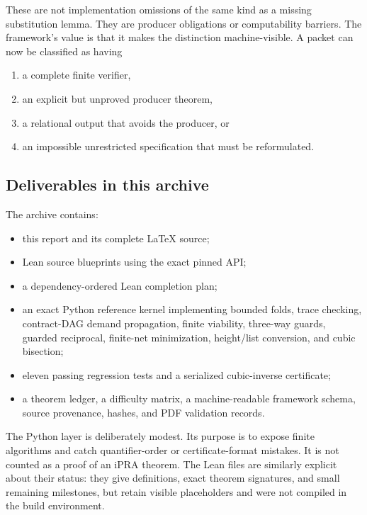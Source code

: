 These are not implementation omissions of the same kind as a missing substitution lemma. They are producer obligations or computability barriers. The framework's value is that it makes the distinction machine-visible. A packet can now be classified as having
\begin{enumerate}
\item a complete finite verifier,
\item an explicit but unproved producer theorem,
\item a relational output that avoids the producer, or
\item an impossible unrestricted specification that must be reformulated.
\end{enumerate}

\subsection{Deliverables in this archive}

The archive contains:
\begin{itemize}
\item this report and its complete \LaTeX{} source;
\item Lean source blueprints using the exact pinned  API;
\item a dependency-ordered Lean completion plan;
\item an exact Python reference kernel implementing bounded folds, trace checking, contract-DAG demand propagation, finite viability, three-way guards, guarded reciprocal, finite-net minimization, height/list conversion, and cubic bisection;
\item eleven passing regression tests and a serialized cubic-inverse certificate;
\item a theorem ledger, a difficulty matrix, a machine-readable framework schema, source provenance, hashes, and PDF validation records.
\end{itemize}

The Python layer is deliberately modest. Its purpose is to expose finite algorithms and catch quantifier-order or certificate-format mistakes. It is not counted as a proof of an iPRA theorem. The Lean files are similarly explicit about their status: they give definitions, exact theorem signatures, and small remaining milestones, but retain visible  placeholders and were not compiled in the build environment.
